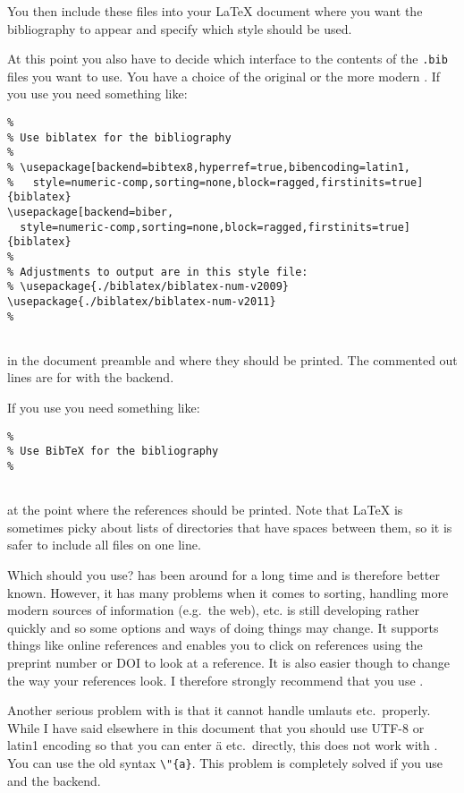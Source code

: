 You then include these files into your \LaTeX{} document where you
want the bibliography to appear and specify which style should be
used.

At this point you also have to decide which interface to the contents
of the \texttt{.bib} files you want to use. You have a choice of the
original \BibTeX{} or the more modern
. If you use  you
need something like:
\begin{verbatim}
%
% Use biblatex for the bibliography
%
% \usepackage[backend=bibtex8,hyperref=true,bibencoding=latin1,
%   style=numeric-comp,sorting=none,block=ragged,firstinits=true]{biblatex}
\usepackage[backend=biber,
  style=numeric-comp,sorting=none,block=ragged,firstinits=true]{biblatex}
%
% Adjustments to output are in this style file:
% \usepackage{./biblatex/biblatex-num-v2009}
\usepackage{./biblatex/biblatex-num-v2011}
% 


\end{verbatim}
in the document preamble and  where they
should be printed. The commented out lines are for  with
the  backend.
\par\noindent
If you use \BibTeX{} you need something like:
\begin{verbatim}
%
% Use BibTeX for the bibliography
%


\end{verbatim}
at the point where the references should be printed.
Note that \LaTeX{} is sometimes picky about lists of directories that
have spaces between them, so it is safer to include all files on one line.

Which should you use? \BibTeX{} has been around for a long time and is
therefore better known. However, it has many problems when it comes to
sorting, handling more modern sources of information (e.g.\ the web),
etc.  is still developing rather quickly and
so some options and ways of doing things may change. It supports
things like online references and enables you to click on references
using the preprint number or DOI to look at a reference. It is also
easier though to change the way your references look. I therefore
strongly recommend that you use .

Another serious problem with \BibTeX{} is that it cannot handle
umlauts etc.\ properly. While I have said elsewhere in this document
that you should use UTF-8 or latin1 encoding so that you can enter ä
etc.\ directly, this does not work with \BibTeX. You can use the
old syntax \verb+\"{a}+. This problem is completely solved if you use
 and the  backend.

